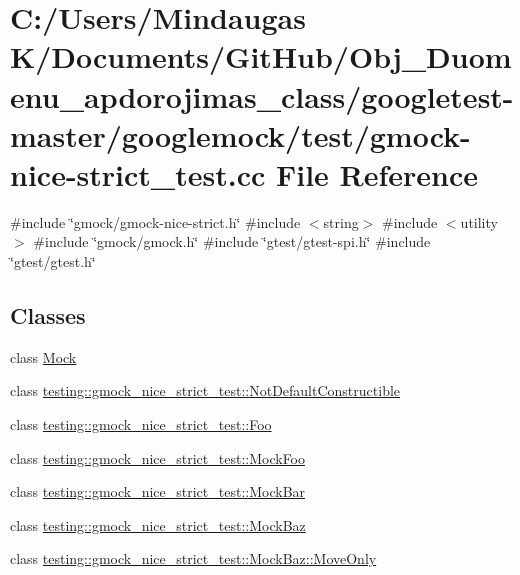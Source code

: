 \hypertarget{googletest-master_2googlemock_2test_2gmock-nice-strict__test_8cc}{}\section{C\+:/\+Users/\+Mindaugas K/\+Documents/\+Git\+Hub/\+Obj\+\_\+\+Duomenu\+\_\+apdorojimas\+\_\+class/googletest-\/master/googlemock/test/gmock-\/nice-\/strict\+\_\+test.cc File Reference}
\label{googletest-master_2googlemock_2test_2gmock-nice-strict__test_8cc}
{\ttfamily \#include \char`\"{}gmock/gmock-\/nice-\/strict.\+h\char`\"{}}\newline
{\ttfamily \#include $<$string$>$}\newline
{\ttfamily \#include $<$utility$>$}\newline
{\ttfamily \#include \char`\"{}gmock/gmock.\+h\char`\"{}}\newline
{\ttfamily \#include \char`\"{}gtest/gtest-\/spi.\+h\char`\"{}}\newline
{\ttfamily \#include \char`\"{}gtest/gtest.\+h\char`\"{}}\newline
\subsection*{Classes}
\begin{DoxyCompactItemize}
\item 
class \mbox{\hyperlink{class_mock}{Mock}}
\item 
class \mbox{\hyperlink{classtesting_1_1gmock__nice__strict__test_1_1_not_default_constructible}{testing\+::gmock\+\_\+nice\+\_\+strict\+\_\+test\+::\+Not\+Default\+Constructible}}
\item 
class \mbox{\hyperlink{classtesting_1_1gmock__nice__strict__test_1_1_foo}{testing\+::gmock\+\_\+nice\+\_\+strict\+\_\+test\+::\+Foo}}
\item 
class \mbox{\hyperlink{classtesting_1_1gmock__nice__strict__test_1_1_mock_foo}{testing\+::gmock\+\_\+nice\+\_\+strict\+\_\+test\+::\+Mock\+Foo}}
\item 
class \mbox{\hyperlink{classtesting_1_1gmock__nice__strict__test_1_1_mock_bar}{testing\+::gmock\+\_\+nice\+\_\+strict\+\_\+test\+::\+Mock\+Bar}}
\item 
class \mbox{\hyperlink{classtesting_1_1gmock__nice__strict__test_1_1_mock_baz}{testing\+::gmock\+\_\+nice\+\_\+strict\+\_\+test\+::\+Mock\+Baz}}
\item 
class \mbox{\hyperlink{classtesting_1_1gmock__nice__strict__test_1_1_mock_baz_1_1_move_only}{testing\+::gmock\+\_\+nice\+\_\+strict\+\_\+test\+::\+Mock\+Baz\+::\+Move\+Only}}
\end{DoxyCompactItemize}
